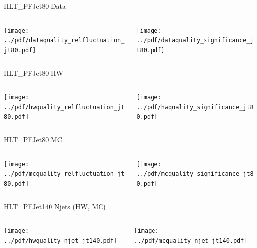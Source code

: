 \documentclass[9pt]{beamer}
\begin{document}
\begin{frame}[t]{HLT\_PFJet80 Data}
\begin{columns}[T]
  \begin{column}{.5\textwidth}
  \texttt{[image: ../pdf/dataquality\_relfluctuation\_jt80.pdf]}
  \end{column}
  \begin{column}{.5\textwidth}
  \texttt{[image: ../pdf/dataquality\_significance\_jt80.pdf]}
  \end{column}
\end{columns}
\end{frame}

\begin{frame}[t]{HLT\_PFJet80 HW}
\begin{columns}[T]
  \begin{column}{.5\textwidth}
  \texttt{[image: ../pdf/hwquality\_relfluctuation\_jt80.pdf]}
  \end{column}
  \begin{column}{.5\textwidth}
  \texttt{[image: ../pdf/hwquality\_significance\_jt80.pdf]}
  \end{column}
\end{columns}
\end{frame}

\begin{frame}[t]{HLT\_PFJet80 MC}
\begin{columns}[T]
  \begin{column}{.5\textwidth}
  \texttt{[image: ../pdf/mcquality\_relfluctuation\_jt80.pdf]}
  \end{column}
  \begin{column}{.5\textwidth}
  \texttt{[image: ../pdf/mcquality\_significance\_jt80.pdf]}
  \end{column}
\end{columns}
\end{frame}

\begin{frame}[t]{HLT\_PFJet140 Njets (HW, MC)}
\begin{columns}[T]
  \begin{column}{.5\textwidth}
  \texttt{[image: ../pdf/hwquality\_njet\_jt140.pdf]}
  \end{column}
  \begin{column}{.5\textwidth}
  \texttt{[image: ../pdf/mcquality\_njet\_jt140.pdf]}
  \end{column}
\end{columns}
\end{frame}
\end{document}
